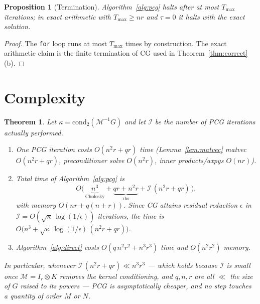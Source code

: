 \documentclass[12pt]{article}
\newtheorem{theorem}{Theorem}
\newtheorem{proposition}{Proposition}
\begin{document}
\begin{proposition}[Termination]\label{prop:term}
Algorithm~\ref{alg:pcg} halts after at most $T_{\max}$ iterations; in exact
arithmetic with $T_{\max}\ge nr$ and $\tau=0$ it halts with the exact solution.
\end{proposition}
\begin{proof}
The \texttt{for} loop runs at most $T_{\max}$ times by construction. The exact
arithmetic claim is the finite termination of CG used in
Theorem~\ref{thm:correct}(b).
\end{proof}

\section{Complexity}

\begin{theorem}\label{thm:complexity}
Let $\kappa=\mathrm{cond}_2(\mathcal M^{-1}G)$ and let $\mathcal I$ be the number
of PCG iterations actually performed.
\begin{enumerate}[label=(\alph*)]
\item One PCG iteration costs $O(n^2r+qr)$ time (Lemma~\ref{lem:matvec} matvec
$O(n^2r+qr)$, preconditioner solve $O(n^2r)$, inner products/axpys $O(nr)$).
\item Total time of Algorithm~\ref{alg:pcg} is
\[
  O\!\big(\,\underbrace{n^3}_{\text{Cholesky}}+\underbrace{qr+n^2r}_{\text{rhs}}
  +\mathcal I\,(n^2r+qr)\,\big),
\]
with memory $O(nr+q(n+r))$. Since CG attains residual reduction $\epsilon$ in
$\mathcal I=O(\sqrt{\kappa}\,\log(1/\epsilon))$ iterations, the time is
$O\!\big(n^3+ \sqrt{\kappa}\,\log(1/\epsilon)\,(n^2r+qr)\big)$.
\item Algorithm~\ref{alg:direct} costs $O(q\,n^2r^2+n^3r^3)$ time and
$O(n^2r^2)$ memory.
\end{enumerate}
In particular, whenever $\mathcal I\,(n^2r+qr)\ll n^3r^3$ — which holds because
$\mathcal I$ is small once $\mathcal M=I_r\otimes K$ removes the kernel
conditioning, and $q,n,r$ are all $\ll$ the size of $G$ raised to its powers —
PCG is asymptotically cheaper, and no step touches a quantity of order $M$ or
$N$.
\end{theorem}
\end{document}
